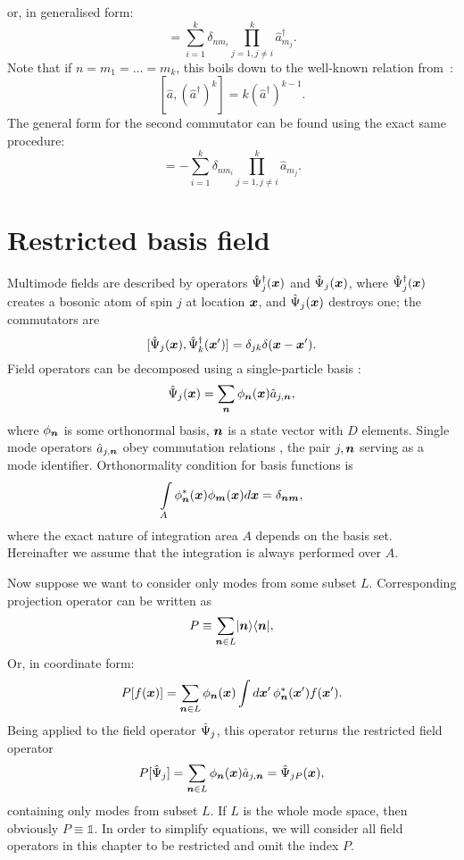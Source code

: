 or, in generalised form:
\begin{equation}
	[ \hat{a}_n, \hat{a}_{m_1}^\dagger \ldots \hat{a}_{m_k}^\dagger ]
	= \sum\limits_{i=1}^k \delta_{n m_i}
		\prod\limits_{j=1,j \ne i}^k \hat{a}_{m_j}^\dagger.
\end{equation}
Note that if $n = m_1 = \ldots = m_k$, this boils down to the well-known relation from~\cite{Louisell1990}:
\[
	[ \hat{a}, (\hat{a}^\dagger)^k ] = k (\hat{a}^\dagger)^{k-1}.
\]
The general form for the second commutator can be found using the exact same procedure:
\begin{equation}
	[ \hat{a}_n^\dagger, \hat{a}_{m_1} \ldots \hat{a}_{m_k} ]
	= - \sum\limits_{i=1}^k \delta_{n m_i}
		\prod\limits_{j=1,j \ne i}^k \hat{a}_{m_j}.
\end{equation}


\section{Restricted basis field}

Multimode fields are described by operators $\hat{\Psi}_j^{\dagger}(\boldsymbol{x})$ and $\hat{\Psi}_j(\boldsymbol{x})$,
where $\hat{\Psi}_j^{\dagger}(\boldsymbol{x})$ creates a bosonic atom of spin $j$ at location $\boldsymbol{x}$,
and $\hat{\Psi}_j(\boldsymbol{x})$ destroys one;
the commutators are
\begin{equation}
\label{eqn:multimode-formalism:multimode-commutators}
	[ \hat{\Psi}_j(\boldsymbol{x}), \hat{\Psi}_k^{\dagger}(\boldsymbol{x}^\prime) ]
	= \delta_{jk} \delta(\boldsymbol{x}-\boldsymbol{x}^\prime).
\end{equation}
Field operators can be decomposed using a single-particle basis :
\[
	\hat{\Psi}_j(\boldsymbol{x}) = \sum\limits_{\boldsymbol{n}} \phi_{\boldsymbol{n}}(\boldsymbol{x}) \hat{a}_{j,\boldsymbol{n}},
\]
where $\phi_{\boldsymbol{n}}$ is some orthonormal basis,
$\boldsymbol{n}$ is a state vector with $D$ elements.
Single mode operators $\hat{a}_{j,\boldsymbol{n}}$ obey commutation relations ,
the pair $j,\boldsymbol{n}$ serving as a mode identifier.
Orthonormality condition for basis functions is
\[
	\int\limits_A \phi_{\boldsymbol{n}}^*(\boldsymbol{x}) \phi_{\boldsymbol{m}}(\boldsymbol{x}) d\boldsymbol{x} = \delta_{\boldsymbol{n}\boldsymbol{m}},
\]
where the exact nature of integration area $A$ depends on the basis set.
Hereinafter we assume that the integration is always performed over $A$.

Now suppose we want to consider only modes from some subset $L$.
Corresponding projection operator can be written as
\[
	P \equiv \sum\limits_{\boldsymbol{n} \in L} \lvert \boldsymbol{n} \rangle \langle \boldsymbol{n} \rvert,
\]
Or, in coordinate form:
\[
	P [f(\boldsymbol{x})]
	= \sum\limits_{\boldsymbol{n} \in L} \phi_{\boldsymbol{n}} (\boldsymbol{x}) \int
		d\boldsymbol{x}^\prime\, \phi_{\boldsymbol{n}}^*(\boldsymbol{x}^\prime) f(\boldsymbol{x}^\prime).
\]
Being applied to the field operator $\hat{\Psi}_j$, this operator returns the restricted field operator
\[
	P [\hat{\Psi}_j]
	= \sum\limits_{\boldsymbol{n} \in L} \phi_{\boldsymbol{n}} (\boldsymbol{x}) \hat{a}_{j,\boldsymbol{n}}
	= \hat{\Psi}_{jP} (\boldsymbol{x}),
\]
containing only modes from subset $L$.
If $L$ is the whole mode space, then obviously $P \equiv \mathds{1}$.
In order to simplify equations, we will consider all field operators in this chapter to be restricted and omit the index $P$.

